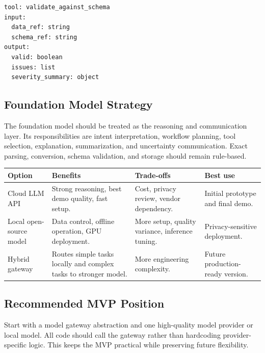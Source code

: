 \begin{verbatim}
tool: validate_against_schema
input:
  data_ref: string
  schema_ref: string
output:
  valid: boolean
  issues: list
  severity_summary: object
\end{verbatim}

\subsection{Foundation Model Strategy}

The foundation model should be treated as the reasoning and communication layer. Its responsibilities are intent interpretation, workflow planning, tool selection, explanation, summarization, and uncertainty communication. Exact parsing, conversion, schema validation, and storage should remain rule-based.

\begin{tabularx}{\textwidth}{p{}X X X}
\toprule
\textbf{Option} & \textbf{Benefits} & \textbf{Trade-offs} & \textbf{Best use} \\
\midrule
Cloud LLM API & Strong reasoning, best demo quality, fast setup. & Cost, privacy review, vendor dependency. & Initial prototype and final demo. \\
Local open-source model & Data control, offline operation, GPU deployment. & More setup, quality variance, inference tuning. & Privacy-sensitive deployment. \\
Hybrid gateway & Routes simple tasks locally and complex tasks to stronger model. & More engineering complexity. & Future production-ready version. \\
\bottomrule
\end{tabularx}

\subsection{Recommended MVP Position}

Start with a model gateway abstraction and one high-quality model provider or local model. All code should call the gateway rather than hardcoding provider-specific logic. This keeps the MVP practical while preserving future flexibility.
